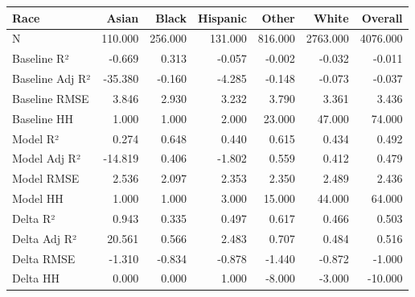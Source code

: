 \begin{tabular}{lrrrrrr}
\toprule
Race &   Asian &   Black &  Hispanic &   Other &    White &  Overall \\
\midrule
N               & 110.000 & 256.000 &   131.000 & 816.000 & 2763.000 & 4076.000 \\
Baseline R²     &  -0.669 &   0.313 &    -0.057 &  -0.002 &   -0.032 &   -0.011 \\
Baseline Adj R² & -35.380 &  -0.160 &    -4.285 &  -0.148 &   -0.073 &   -0.037 \\
Baseline RMSE   &   3.846 &   2.930 &     3.232 &   3.790 &    3.361 &    3.436 \\
Baseline HH     &   1.000 &   1.000 &     2.000 &  23.000 &   47.000 &   74.000 \\
Model R²        &   0.274 &   0.648 &     0.440 &   0.615 &    0.434 &    0.492 \\
Model Adj R²    & -14.819 &   0.406 &    -1.802 &   0.559 &    0.412 &    0.479 \\
Model RMSE      &   2.536 &   2.097 &     2.353 &   2.350 &    2.489 &    2.436 \\
Model HH        &   1.000 &   1.000 &     3.000 &  15.000 &   44.000 &   64.000 \\
Delta R²        &   0.943 &   0.335 &     0.497 &   0.617 &    0.466 &    0.503 \\
Delta Adj R²    &  20.561 &   0.566 &     2.483 &   0.707 &    0.484 &    0.516 \\
Delta RMSE      &  -1.310 &  -0.834 &    -0.878 &  -1.440 &   -0.872 &   -1.000 \\
Delta HH        &   0.000 &   0.000 &     1.000 &  -8.000 &   -3.000 &  -10.000 \\
\bottomrule
\end{tabular}
